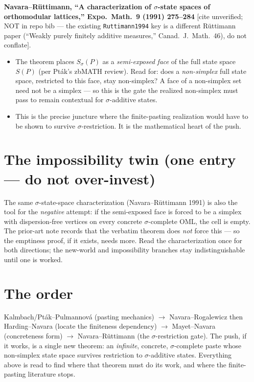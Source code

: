 \documentclass[11pt]{article}
\begin{document}
\noindent\textbf{Navara--R\"uttimann, ``A characterization of $\sigma$-state spaces of
orthomodular lattices,'' Expo.\ Math.\ 9 (1991) 275--284} \textup{[cite unverified; NOT
in repo bib --- the existing \texttt{Ruttimann1994} key is a different R\"uttimann paper
(``Weakly purely finitely additive measures,'' Canad.\ J.\ Math.\ 46), do not conflate]}.
\begin{itemize}[leftmargin=*]
  \item The theorem places $S_\sigma(P)$ as a \emph{semi-exposed face} of the full state
    space $S(P)$ (per Pt\'ak's zbMATH review). Read for: does a \emph{non-simplex} full
    state space, restricted to this face, stay non-simplex? A face of a non-simplex set
    need not be a simplex --- so this is the gate the realized non-simplex must pass to
    remain contextual for \emph{$\sigma$}-additive states.
  \item This is the precise juncture where the finite-pasting realization would have to be
    shown to survive $\sigma$-restriction. It is the mathematical heart of the push.
\end{itemize}

\section{The impossibility twin (one entry --- do not over-invest)}

\noindent The same $\sigma$-state-space characterization
(Navara--R\"uttimann 1991) is also the tool for the \emph{negative}
attempt: if the semi-exposed face is forced to be a simplex with dispersion-free
vertices on every concrete $\sigma$-complete OML, the cell is empty. The prior-art note
records that the verbatim theorem does \emph{not} force this --- so the emptiness proof,
if it exists, needs more. Read the characterization once for both directions; the
new-world and impossibility branches stay indistinguishable until one is worked.

\section*{The order}

\noindent Kalmbach/Pt\'ak--Pulmannov\'a (pasting mechanics) $\to$
Navara--Rogalewicz then Harding--Navara (locate the finiteness dependency) $\to$
Mayet--Navara (concreteness form) $\to$ Navara--R\"uttimann (the $\sigma$-restriction
gate). The push, if it works, is a single new theorem: an \emph{infinite}, concrete,
$\sigma$-complete paste whose non-simplex state space survives restriction to
$\sigma$-additive states. Everything above is read to find where that theorem must do
its work, and where the finite-pasting literature stops.



\end{document}
